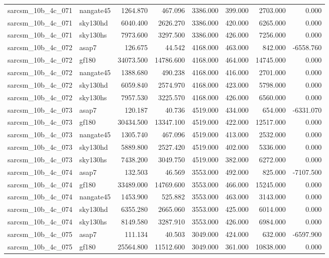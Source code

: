 \begin{tabular}{llrrrrrr}
sarcsm\_10b\_4c\_071 & nangate45 & 1264.870 & 467.096 & 3386.000 & 399.000 & 2703.000 & 0.000 \\
sarcsm\_10b\_4c\_071 & sky130hd & 6040.400 & 2626.270 & 3386.000 & 420.000 & 6265.000 & 0.000 \\
sarcsm\_10b\_4c\_071 & sky130hs & 7973.600 & 3297.500 & 3386.000 & 426.000 & 7256.000 & 0.000 \\
sarcsm\_10b\_4c\_072 & asap7 & 126.675 & 44.542 & 4168.000 & 463.000 & 842.000 & -6558.760 \\
sarcsm\_10b\_4c\_072 & gf180 & 34073.500 & 14786.600 & 4168.000 & 464.000 & 14745.000 & 0.000 \\
sarcsm\_10b\_4c\_072 & nangate45 & 1388.680 & 490.238 & 4168.000 & 416.000 & 2701.000 & 0.000 \\
sarcsm\_10b\_4c\_072 & sky130hd & 6059.840 & 2574.970 & 4168.000 & 423.000 & 5798.000 & 0.000 \\
sarcsm\_10b\_4c\_072 & sky130hs & 7957.530 & 3225.570 & 4168.000 & 426.000 & 6560.000 & 0.000 \\
sarcsm\_10b\_4c\_073 & asap7 & 120.187 & 40.736 & 4519.000 & 434.000 & 654.000 & -6331.070 \\
sarcsm\_10b\_4c\_073 & gf180 & 30434.500 & 13347.100 & 4519.000 & 422.000 & 12517.000 & 0.000 \\
sarcsm\_10b\_4c\_073 & nangate45 & 1305.740 & 467.096 & 4519.000 & 413.000 & 2532.000 & 0.000 \\
sarcsm\_10b\_4c\_073 & sky130hd & 5889.800 & 2527.420 & 4519.000 & 402.000 & 5336.000 & 0.000 \\
sarcsm\_10b\_4c\_073 & sky130hs & 7438.200 & 3049.750 & 4519.000 & 382.000 & 6272.000 & 0.000 \\
sarcsm\_10b\_4c\_074 & asap7 & 132.503 & 46.569 & 3553.000 & 492.000 & 825.000 & -7107.500 \\
sarcsm\_10b\_4c\_074 & gf180 & 33489.000 & 14769.600 & 3553.000 & 466.000 & 15245.000 & 0.000 \\
sarcsm\_10b\_4c\_074 & nangate45 & 1453.900 & 525.882 & 3553.000 & 463.000 & 3143.000 & 0.000 \\
sarcsm\_10b\_4c\_074 & sky130hd & 6355.280 & 2665.060 & 3553.000 & 425.000 & 6014.000 & 0.000 \\
sarcsm\_10b\_4c\_074 & sky130hs & 8149.580 & 3287.910 & 3553.000 & 426.000 & 6984.000 & 0.000 \\
sarcsm\_10b\_4c\_075 & asap7 & 111.134 & 40.503 & 3049.000 & 424.000 & 632.000 & -6597.900 \\
sarcsm\_10b\_4c\_075 & gf180 & 25564.800 & 11512.600 & 3049.000 & 361.000 & 10838.000 & 0.000 \\

\end{tabular}
